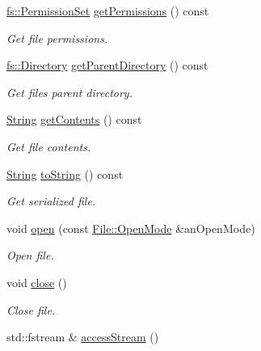 \begin{DoxyCompactItemize}
\mbox{\hyperlink{classlibrary_1_1core_1_1fs_1_1_permission_set}{fs\+::\+Permission\+Set}} \mbox{\hyperlink{classlibrary_1_1core_1_1fs_1_1_file_a0addf18f7510955e48fdef2416b98423}{get\+Permissions}} () const
\begin{DoxyCompactList}\small\item\em Get file permissions. \end{DoxyCompactList}\item 
\mbox{\hyperlink{classlibrary_1_1core_1_1fs_1_1_directory}{fs\+::\+Directory}} \mbox{\hyperlink{classlibrary_1_1core_1_1fs_1_1_file_a8eb74097f9bdc9d3c626fe4924bf405e}{get\+Parent\+Directory}} () const
\begin{DoxyCompactList}\small\item\em Get file\textquotesingle{}s parent directory. \end{DoxyCompactList}\item 
\mbox{\hyperlink{classlibrary_1_1core_1_1types_1_1_string}{String}} \mbox{\hyperlink{classlibrary_1_1core_1_1fs_1_1_file_a0a48a4d886d255e53e35511f1519e7fa}{get\+Contents}} () const
\begin{DoxyCompactList}\small\item\em Get file contents. \end{DoxyCompactList}\item 
\mbox{\hyperlink{classlibrary_1_1core_1_1types_1_1_string}{String}} \mbox{\hyperlink{classlibrary_1_1core_1_1fs_1_1_file_a891360e0ec67f357b528b3a1827d8c21}{to\+String}} () const
\begin{DoxyCompactList}\small\item\em Get serialized file. \end{DoxyCompactList}\item 
void \mbox{\hyperlink{classlibrary_1_1core_1_1fs_1_1_file_ad02420dc1c5238f384ca1e5a75b13ee9}{open}} (const \mbox{\hyperlink{classlibrary_1_1core_1_1fs_1_1_file_ac18b7d7ee50c803cbd0087b0f71ce4f7}{File\+::\+Open\+Mode}} \&an\+Open\+Mode)
\begin{DoxyCompactList}\small\item\em Open file. \end{DoxyCompactList}\item 
void \mbox{\hyperlink{classlibrary_1_1core_1_1fs_1_1_file_adf4fc7f78493f2ae10e228519ce46cf4}{close}} ()
\begin{DoxyCompactList}\small\item\em Close file. \end{DoxyCompactList}\item 
std\+::fstream \& \mbox{\hyperlink{classlibrary_1_1core_1_1fs_1_1_file_a2d6b8d823c82ebc60fefc459e2b7aa33}{access\+Stream}} ()

\end{DoxyCompactItemize}
